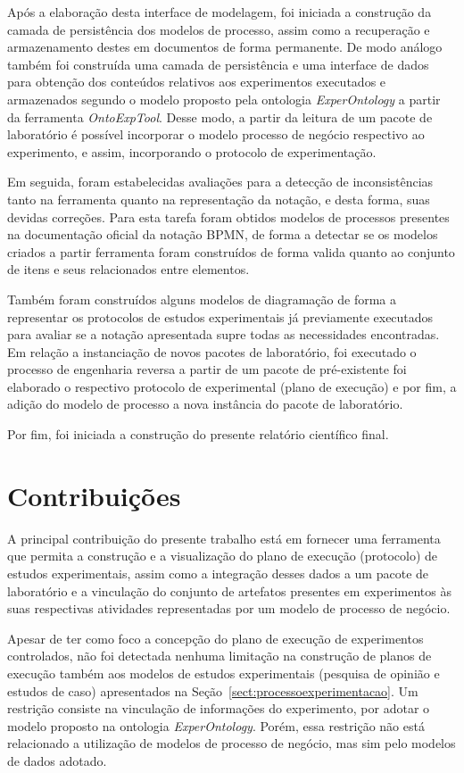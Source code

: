 Após a elaboração desta interface de modelagem, foi iniciada a construção da camada de persistência dos modelos de processo, assim como a recuperação e armazenamento destes em documentos de forma permanente. De modo análogo também foi construída uma camada de persistência e uma interface de dados para obtenção dos conteúdos relativos aos experimentos executados e armazenados segundo o modelo proposto pela ontologia \textit{ExperOntology} a partir da ferramenta \textit{OntoExpTool}. Desse modo, a partir da leitura de um pacote de laboratório é possível incorporar o modelo processo de negócio respectivo ao experimento, e assim, incorporando o protocolo de experimentação.

Em seguida, foram estabelecidas avaliações para a detecção de inconsistências tanto na ferramenta quanto na representação da notação, e desta forma, suas devidas correções. Para esta tarefa foram obtidos modelos de processos presentes na documentação oficial da notação BPMN, de forma a detectar se os modelos criados a partir ferramenta foram construídos de forma valida quanto ao conjunto de itens e seus relacionados entre elementos.

Também foram construídos alguns modelos de diagramação de forma a representar os protocolos de estudos experimentais já previamente executados para avaliar se a notação apresentada supre todas as necessidades encontradas. Em relação a instanciação de novos pacotes de laboratório, foi executado o processo de engenharia reversa a partir de um pacote de pré-existente foi elaborado o respectivo protocolo de experimental (plano de execução) e por fim, a adição do modelo de processo a nova instância do pacote de laboratório. 

Por fim, foi iniciada a construção do presente relatório científico final.

\section{Contribuições}

A principal contribuição do presente trabalho está em fornecer uma ferramenta que permita a construção e a visualização do plano de execução (protocolo) de estudos experimentais, assim como a integração desses dados a um pacote de laboratório e a vinculação do conjunto de artefatos presentes  em experimentos às suas respectivas atividades representadas por um modelo de processo de negócio.

Apesar de ter como foco a concepção do plano de execução de experimentos controlados, não foi detectada nenhuma limitação na construção de planos de execução também aos modelos de estudos experimentais (pesquisa de opinião e estudos de caso) apresentados na Seção~\ref{sect:processoexperimentacao}. Um restrição consiste na vinculação de informações do experimento, por adotar o modelo proposto na ontologia \textit{ExperOntology}. Porém, essa restrição não está relacionado a utilização de modelos de processo de negócio, mas sim pelo modelos de dados adotado.

